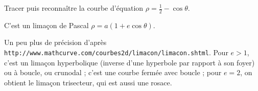 \begin{enonce}
\begin{exercise}[ID={RMS 120/860 Centrale PSI},subtitle={},tags={}, difficulty={0}]
Tracer puis reconnaître la courbe d'équation $\rho=\frac12-\cos\theta$.
\end{exercise}
\begin{solution}
C'est un limaçon de Pascal $\rho=a(1+e\cos\theta)$.

Un peu plus de précision d'après \texttt{http://www.mathcurve.com/courbes2d/limacon/limacon.shtml}.
Pour $e>1$, c'est un limaçon hyperbolique (inverse d’une hyperbole par rapport à son foyer) ou à boucle, ou crunodal ; c'est une courbe fermée avec boucle ; pour $e = 2$, on obtient le limaçon trisecteur, qui est aussi une rosace.
\end{solution}
\end{enonce}
